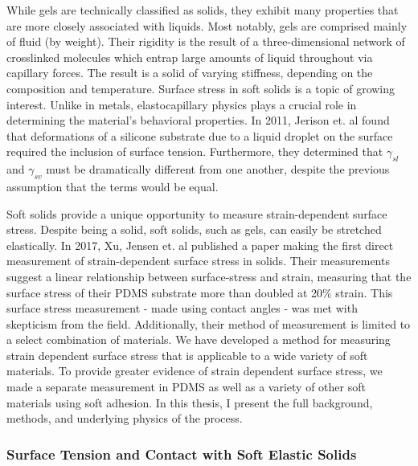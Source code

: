 While gels are technically classified as solids, they exhibit many properties that are more closely associated with liquids. Most notably, gels are comprised mainly of fluid (by weight). Their rigidity is the result of a three-dimensional network of crosslinked molecules which entrap large amounts of liquid throughout via capillary forces. The result is a solid of varying stiffness, depending on the composition and temperature. Surface stress in soft solids is a topic of growing interest. Unlike in metals, elastocapillary physics plays a crucial role in determining the material's behavioral properties. In 2011, Jerison et. al \cite{jerison2011deformation} found that deformations of a silicone substrate due to a liquid droplet on the surface required the inclusion of surface tension. Furthermore, they determined that $\gamma_{sl}$ and $\gamma_{sv}$ must be dramatically different from one another, despite the previous assumption that the terms would be equal.

Soft solids provide a unique opportunity to measure strain-dependent surface stress. Despite being a solid, soft solids, such as gels, can easily be stretched elastically. In 2017, Xu, Jensen et. al published a paper \cite{xu2017direct} making the first direct measurement of strain-dependent surface stress in solids. Their measurements suggest a linear relationship between surface-stress and strain, measuring that the surface stress of their PDMS substrate more than doubled at 20\% strain. This surface stress measurement - made using contact angles - was met with skepticism from the field. Additionally, their method of measurement is limited to a select combination of materials. We have developed a method for measuring strain dependent surface stress that is applicable to a wide variety of soft materials. To provide greater evidence of strain dependent surface stress, we made a separate measurement in PDMS as well as a variety of other soft materials using soft adhesion. In this thesis, I present the full background, methods, and underlying physics of the process.    




 



\subsubsection{Surface Tension and Contact with Soft Elastic Solids}

